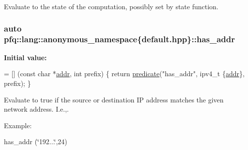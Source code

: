 Evaluate to the state of the computation, possibly set by {\ttfamily state} function. 

\subsubsection[{\texorpdfstring{has\+\_\+addr}{has_addr}}]{\setlength{\rightskip}{0pt plus 5cm}auto pfq\+::lang\+::anonymous\+\_\+namespace\{default.\+hpp\}\+::has\+\_\+addr}\hypertarget{namespacepfq_1_1lang_1_1anonymous__namespace_02default_8hpp_03_a74c6b7e812fb3d312ebf534960a6a91d}{}\label{namespacepfq_1_1lang_1_1anonymous__namespace_02default_8hpp_03_a74c6b7e812fb3d312ebf534960a6a91d}
{\bfseries Initial value\+:}
\begin{DoxyCode}
= [] (\textcolor{keyword}{const} \textcolor{keywordtype}{char} *\hyperlink{namespacepfq_1_1lang_1_1anonymous__namespace_02default_8hpp_03_a13cabe468839119d8d68540e3c60718b}{addr}, \textcolor{keywordtype}{int} prefix)
        \{
            \textcolor{keywordflow}{return} \hyperlink{namespacepfq_1_1lang_aca9adafc436b7f851621b979fa1aaf88}{predicate}(\textcolor{stringliteral}{"has\_addr"}, ipv4\_t \{\hyperlink{namespacepfq_1_1lang_1_1anonymous__namespace_02default_8hpp_03_a13cabe468839119d8d68540e3c60718b}{addr}\}, prefix);
        \}
\end{DoxyCode}


Evaluate to {\ttfamily true} if the source or destination IP address matches the given network address. I.\+e.,. 

Example\+:

has\+\_\+addr (\char`\"{}192...\char`\"{},24) 
